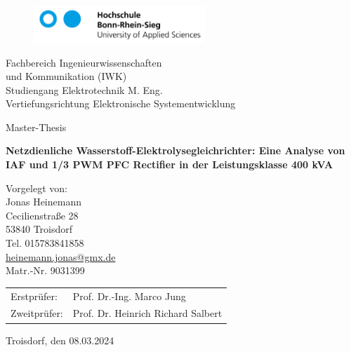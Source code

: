 \begin{titlepage}
	\setlength{\parindent}{0pt}%
	\begin{figure}
		\includegraphics[height=1.4cm]{content/Grafiken/H-BRS_Logo}
		\hfill
		
	\end{figure}
	\vspace{1cm}
	\begin{onehalfspace}
		 Fachbereich Ingenieurwissenschaften\\
		 und Kommunikation (IWK)\\
		Studiengang Elektrotechnik M. Eng.\\
		Vertiefungsrichtung Elektronische Systementwicklung 
		\vspace{2cm}
		\begin{center}
			\begin{singlespacing}
				{\large\textsf{Master-Thesis}\par}
				\vspace{1mm}
				{\huge\textbf{\textsf{
					Netzdienliche Wasserstoff-Elektrolysegleichrichter: Eine Analyse von IAF und 1/3 PWM PFC Rectifier in der Leistungsklasse 400 kVA
				}}\par}
			\end{singlespacing}
		\end{center}
		\vfill
		Vorgelegt von:\\
		Jonas Heinemann\\
		Cecilienstraße 28\\
		53840 Troisdorf\\
		Tel. 015783841858\\
		\href{mailto:heinemann.jonas@gmx.de}{heinemann.jonas@gmx.de}\\
		Matr.-Nr. 9031399
		\begin{table}
			\begin{tabular}{@{}ll}
				Erstprüfer:  & Prof. Dr.-Ing. Marco Jung\\
				Zweitprüfer: & Prof. Dr. Heinrich Richard Salbert\\
			\end{tabular}
		\end{table}
	\end{onehalfspace}
	Troisdorf, den 08.03.2024
\end{titlepage}
